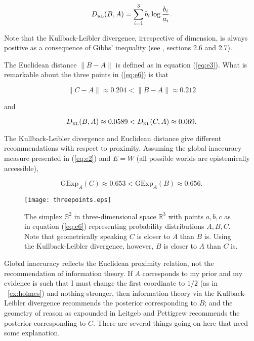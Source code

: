 \documentclass[11pt]{article}
\begin{document}
\begin{equation}
  \label{eq:e7}
  D_{\mbox{\tiny KL}}(B,A)=\sum_{i=1}^{3}b_{i}\log\frac{b_{i}}{a_{i}}.
\end{equation}

Note that the Kullback-Leibler divergence, irrespective of dimension,
is always positive as a consequence of Gibbs' inequality (see
, sections 2.6 and 2.7).

The Euclidean distance $\|B-A\|$ is defined as in equation
(\ref{eq:e3}). What is remarkable about the three points in
(\ref{eq:e6}) is that

\begin{equation}
  \label{eq:e8}
  \|C-A\|\approx{}0.204<\|B-A\|\approx{}0.212
\end{equation}

and

\begin{equation}
  \label{eq:e9}
  D_{\mbox{\tiny KL}}(B,A)\approx{}0.0589<D_{\mbox{\tiny KL}}(C,A)\approx{}0.069.
\end{equation}

The Kullback-Leibler divergence and Euclidean distance give different
re\-commendations with respect to proximity. Assuming the global
inaccuracy measure presented in (\ref{eq:e2}) and $E=W$ (all possible
worlds are epistemically accessible),

\begin{equation}
  \label{eq:e8a}
  \mbox{GExp}_{A}(C)\approx{}0.653<\mbox{GExp}_{A}(B)\approx{}0.656.
\end{equation}

\begin{figure}[ht]
  \begin{flushright}
    \begin{minipage}[h]{.7\linewidth}
      \texttt{[image: threepoints.eps]}
      \caption{\footnotesize The simplex $\mathbb{S}^{2}$ in
        three-dimensional space $\mathbb{R}^{3}$ with points $a,b,c$
        as in equation (\ref{eq:e6}) representing probability
        distributions $A,B,C$. Note that geometrically speaking $C$ is
        closer to $A$ than $B$ is. Using the Kullback-Leibler
        divergence, however, $B$ is closer to $A$ than $C$ is.}
      \label{fig:threepoints}
    \end{minipage}
  \end{flushright}
\end{figure}

Global inaccuracy reflects the Euclidean proximity relation, not the
re\-commendation of information theory. If $A$ corresponds to my prior
and my evidence is such that I must change the first coordinate to
$1/2$ (as in {\xample}~\ref{ex:holmes}) and nothing stronger, then
information theory via the Kullback-Leibler divergence re\-commends
the posterior corresponding to $B$; and the geometry of reason as
expounded in Leitgeb and Pettigrew recommends the posterior
corresponding to $C$. There are several things going on here that need
some explanation.
\end{document}
